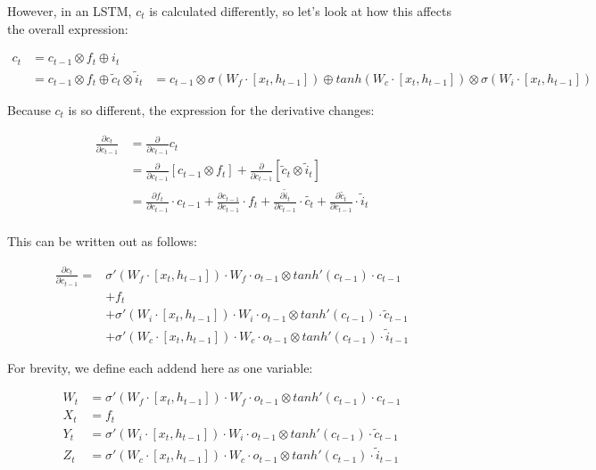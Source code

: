 \noindent
However, in an LSTM, $c_t$ is calculated differently, so let's look at how this affects the overall expression:

\begin{align}
    c_t &= c_{t-1} \otimes f_t \oplus i_t \\
    &=  c_{t-1} \otimes f_t \oplus \tilde{c}_t \otimes \tilde{i}_t
    &= c_{t-1} \otimes \sigma (W_f \cdot [x_t,h_{t-1}]) \oplus tanh(W_c \cdot [x_t,h_{t-1}]) \otimes \sigma (W_i \cdot [x_t,h_{t-1}])
\end{align}

\noindent
Because $c_t$ is so different, the expression for the derivative changes:

\begin{align}
    \frac{\partial c_t}{\partial c_{t-1}} &= \frac{\partial}{\partial c_{t-1}} c_t \\
    &= \frac{\partial}{\partial c_{t-1}} \left[c_{t-1} \otimes f_t \right] + \frac{\partial}{\partial c_{t-1}} \left[\tilde{c}_t \otimes \tilde{i}_t \right] \\
    &= \frac{\partial f_t}{\partial c_{t-1}} \cdot c_{t-1} + \frac{\partial c_{t-1}}{\partial c_{t-1}} \cdot f_t + \frac{\partial \tilde{i}_t}{\partial c_{t-1}} \cdot \tilde{c_t} + \frac{\partial \tilde{c_t}}{\partial c_{t-1}} \cdot \tilde{i}_t \\
\end{align}

\noindent
This can be written out as follows:

\begin{align}
    \frac{\partial c_t}{\partial c_{t-1}} =& \sigma'(W_f \cdot [x_t,h_{t-1}]) \cdot W_f \cdot o_{t-1} \otimes tanh'(c_{t-1}) \cdot c_{t-1} \\
    &+ f_t \\
    &+ \sigma'(W_i \cdot [x_t,h_{t-1}]) \cdot W_i \cdot o_{t-1} \otimes tanh'(c_{t-1}) \cdot \tilde{c}_{t-1} \\
    &+ \sigma'(W_c \cdot [x_t,h_{t-1}]) \cdot W_c \cdot o_{t-1} \otimes tanh'(c_{t-1}) \cdot \tilde{i}_{t-1}
\end{align}

\noindent
For brevity, we define each addend here as one variable:

\begin{align}
    W_t &= \sigma'(W_f \cdot [x_t,h_{t-1}]) \cdot W_f \cdot o_{t-1} \otimes tanh'(c_{t-1}) \cdot c_{t-1} \\
    X_t &= f_t \\
    Y_t &= \sigma'(W_i \cdot [x_t,h_{t-1}]) \cdot W_i \cdot o_{t-1} \otimes tanh'(c_{t-1}) \cdot \tilde{c}_{t-1} \\
    Z_t &= \sigma'(W_c \cdot [x_t,h_{t-1}]) \cdot W_c \cdot o_{t-1} \otimes tanh'(c_{t-1}) \cdot \tilde{i}_{t-1}
\end{align}

